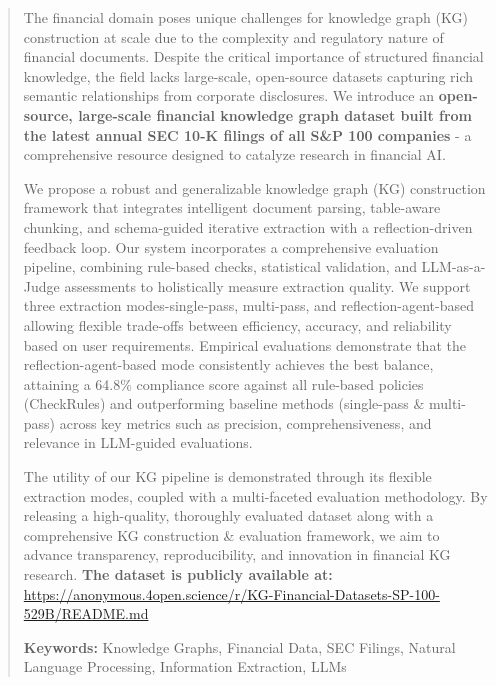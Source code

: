 \begin{abstract}
The financial domain poses unique challenges for knowledge graph (KG) construction at scale due to the complexity and regulatory nature of financial documents. Despite the critical importance of structured financial knowledge, the field lacks large-scale, open-source datasets capturing rich semantic relationships from corporate disclosures. We introduce an \textbf{open-source, large-scale financial knowledge graph dataset built from the latest annual SEC 10-K filings of all S\&P 100 companies} - a comprehensive resource designed to catalyze research in financial AI.

We propose a robust and generalizable knowledge graph (KG) construction framework that integrates intelligent document parsing, table-aware chunking, and schema-guided iterative extraction with a reflection-driven feedback loop. Our system incorporates a comprehensive evaluation pipeline, combining rule-based checks, statistical validation, and LLM-as-a-Judge assessments to holistically measure extraction quality. We support three extraction modes-single-pass, multi-pass, and reflection-agent-based allowing flexible trade-offs between efficiency, accuracy, and reliability based on user requirements. Empirical evaluations demonstrate that the reflection-agent-based mode consistently achieves the best balance, attaining a 64.8\% compliance score against all rule-based policies (CheckRules) and outperforming baseline methods (single-pass \& multi-pass) across key metrics such as precision, comprehensiveness, and relevance in LLM-guided evaluations.

The utility of our KG pipeline is demonstrated through its flexible extraction modes, coupled with a multi-faceted evaluation methodology. By releasing a high-quality, thoroughly evaluated dataset along with a comprehensive KG construction \& evaluation framework, we aim to advance transparency, reproducibility, and innovation in financial KG research. \textbf{The dataset is publicly available at:} \url{https://anonymous.4open.science/r/KG-Financial-Datasets-SP-100-529B/README.md}

\textbf{Keywords:} Knowledge Graphs, Financial Data, SEC Filings, Natural Language Processing, Information Extraction, LLMs
\end{abstract}